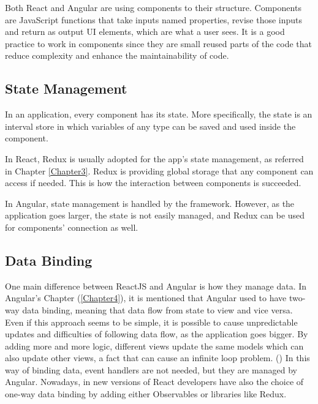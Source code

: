 Both React and Angular are using components to their structure. Components are JavaScript functions that take inputs named properties, revise those inputs and return as output UI elements, which are what a user sees. It is a good practice to work in components since they are small reused parts of the code that reduce complexity and enhance the maintainability of code. \par

\subsection{State Management}

In an application, every component has its state. More specifically, the state is an interval store in which variables of any type can be saved and used inside the component. \par

In React, Redux is usually adopted for the app's state management, as referred in Chapter \ref{Chapter3}. Redux is providing global storage that any component can access if needed. This is how the interaction between components is succeeded. \par

In Angular, state management is handled by the framework. However, as the application goes larger, the state is not easily managed, and Redux can be used for components' connection as well. \par

\subsection{Data Binding}

One main difference between ReactJS and Angular is how they manage data. In Angular's Chapter (\ref{Chapter4}), it is mentioned that Angular used to have two-way data binding, meaning that data flow from state to view and vice versa. Even if this approach seems to be simple, it is possible to cause unpredictable updates and difficulties of following data flow, as the application goes bigger. By adding more and more logic, different views update the same models which can also update other views, a fact that can cause an infinite loop problem. (\cite{reactQuickly}) In this way of binding data, event handlers are not needed, but they are managed by Angular. Nowadays, in new versions of React developers have also the choice of one-way data binding by adding either Observables or libraries like Redux. \par

